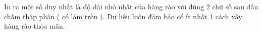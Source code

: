 In ra một số duy nhất là độ dài nhỏ nhất của hàng rào với đúng 2 chữ số sau dấu chấm thập phân ( có làm tròn ). Dữ liệu luôn đảm bảo có ít nhất 1 cách xây hàng rào thỏa mãn.